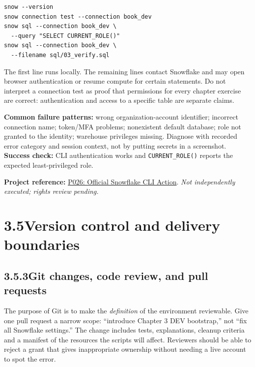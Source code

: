 \documentclass[11pt,twoside]{article}
\newcommand{\topic}[2]{\subsection*{#1\quad #2}}
\newcommand{\repo}[2]{\par\begingroup\fontsize{8.0}{9.6}\selectfont\sffamily\color{inkgray}\textbf{Project reference:} \href{#2}{#1}. \textit{Not independently executed; rights review pending.}\par\endgroup}
\begin{document}
\begin{lstlisting}[caption={Documented CLI command forms; requires approved account access.}]
snow --version
snow connection test --connection book_dev
snow sql --connection book_dev \
  --query "SELECT CURRENT_ROLE()"
snow sql --connection book_dev \
  --filename sql/03_verify.sql
\end{lstlisting}
The first line runs locally. The remaining lines contact Snowflake and may open browser authentication or resume compute for certain statements. Do not interpret a connection test as proof that permissions for every chapter exercise are correct: authentication and access to a specific table are separate claims.

\textbf{Common failure patterns:} wrong organization-account identifier; incorrect connection name; token/MFA problems; nonexistent default database; role not granted to the identity; warehouse privileges missing. Diagnose with recorded error category and session context, not by putting secrets in a screenshot. \textbf{Success check:} CLI authentication works and \texttt{CURRENT\_ROLE()} reports the expected least-privileged role.
\repo{P026: Official Snowflake CLI Action}{https://github.com/snowflakedb/snowflake-cli-action}

\newpage
\section*{3.5\quad Version control and delivery boundaries}
\topic{3.5.3}{Git changes, code review, and pull requests}
The purpose of Git is to make the \emph{definition} of the environment reviewable. Give one pull request a narrow scope: ``introduce Chapter 3 DEV bootstrap,'' not ``fix all Snowflake settings.'' The change includes tests, explanations, cleanup criteria and a manifest of the resources the scripts will affect. Reviewers should be able to reject a grant that gives inappropriate ownership without needing a live account to spot the error.
\end{document}
